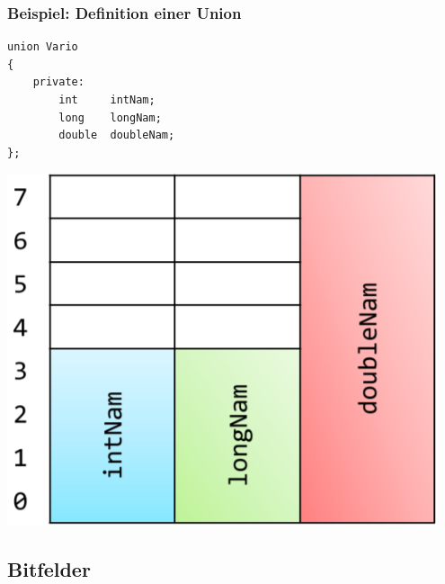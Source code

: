 \subsubsection{Beispiel: Definition einer Union}
\vspace{-\baselineskip}
\begin{minipage}{0.3\linewidth}
\vspace{-\baselineskip}
\begin{minipage}{\linewidth}
\begin{lstlisting}
union Vario
{
	private:
		int 	intNam;
		long	longNam;
		double	doubleNam;
};
\end{lstlisting}
\end{minipage}
\end{minipage}%
\hspace{0.1\linewidth}
\begin{minipage}{0.4\linewidth}
	\includegraphics[width=\linewidth]{images/union.png}
\end{minipage}

\subsection{Bitfelder}

